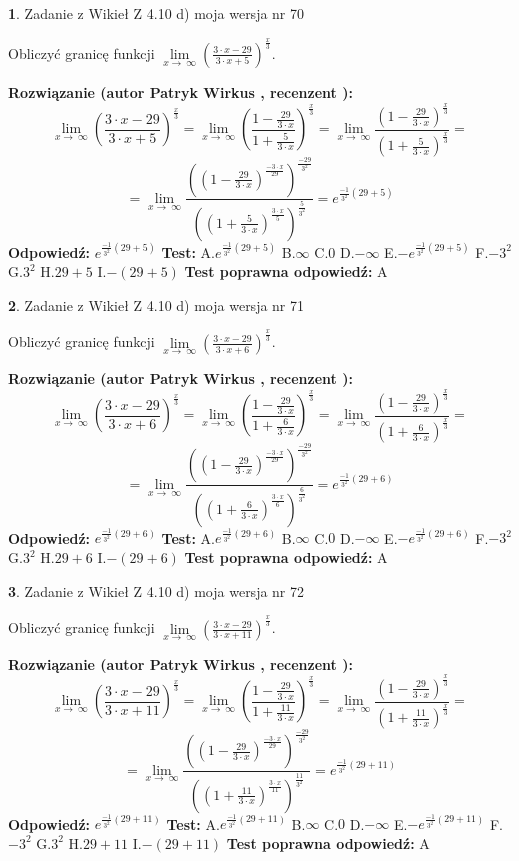 \documentclass[12pt, a4paper]{article}
\theoremstyle{definition} %
\newtheorem{zad}{}
\newcommand{\zadStart}[1]{\begin{zad}#1\newline}
\newcommand{\zadStop}{\end{zad}}
\newcommand{\rozwStart}[2]{\noindent \textbf{Rozwiązanie (autor #1 , recenzent #2): }\newline}
\newcommand{\rozwStop}{\newline}
\newcommand{\odpStart}{\noindent \textbf{Odpowiedź:}\newline}
\newcommand{\odpStop}{\newline}
\newcommand{\testStart}{\noindent \textbf{Test:}\newline}
\newcommand{\testStop}{\newline}
\newcommand{\kluczStart}{\noindent \textbf{Test poprawna odpowiedź:}\newline}
\newcommand{\kluczStop}{\newline}
\begin{document}
\zadStart{Zadanie z Wikieł Z 4.10 d) moja wersja nr 70}


Obliczyć granicę funkcji  $\lim\limits_{x\to\ \infty}(\frac{3\cdot x-29}{3\cdot x+5})^{\frac{x}{3}}$.
\zadStop
\rozwStart{Patryk Wirkus}{}
$$\lim\limits_{x\to\ \infty}(\frac{3\cdot x-29}{3\cdot x+5})^{\frac{x}{3}} = \lim\limits_{x\to\ \infty}(\frac{1-\frac{29}{3\cdot x}}{1+\frac{5}{3\cdot x}})^{\frac{x}{3}}=\lim\limits_{x\to\ \infty}\frac{(1-\frac{29}{3\cdot x})^{\frac{x}{3}}}{(1+\frac{5}{3\cdot x})^{\frac{x}{3}}}=$$
$$=\lim\limits_{x\to\ \infty}\frac{((1-\frac{29}{3\cdot x})^{\frac{-3\cdot x}{29}})^{\frac{-29}{3^{2}}}}{((1+\frac{5}{3\cdot x})^{\frac{3\cdot x}{5}})^{\frac{5}{3^{2}}}}=e^{\frac{-1}{3^{2}}(29+5)}$$
\rozwStop
\odpStart
$e^{\frac{-1}{3^{2}}(29+5)}$
\odpStop
\testStart
A.$e^{\frac{-1}{3^{2}}(29+5)}$ B.$\infty$ C.$0$ D.$-\infty$ E.$-e^{\frac{-1}{3^{2}}(29+5)}$
F.$-3^{2}$ G.$3^{2}$
H.$29+5$
I.$-(29+5)$
\testStop
\kluczStart
A
\kluczStop



\zadStart{Zadanie z Wikieł Z 4.10 d) moja wersja nr 71}


Obliczyć granicę funkcji  $\lim\limits_{x\to\ \infty}(\frac{3\cdot x-29}{3\cdot x+6})^{\frac{x}{3}}$.
\zadStop
\rozwStart{Patryk Wirkus}{}
$$\lim\limits_{x\to\ \infty}(\frac{3\cdot x-29}{3\cdot x+6})^{\frac{x}{3}} = \lim\limits_{x\to\ \infty}(\frac{1-\frac{29}{3\cdot x}}{1+\frac{6}{3\cdot x}})^{\frac{x}{3}}=\lim\limits_{x\to\ \infty}\frac{(1-\frac{29}{3\cdot x})^{\frac{x}{3}}}{(1+\frac{6}{3\cdot x})^{\frac{x}{3}}}=$$
$$=\lim\limits_{x\to\ \infty}\frac{((1-\frac{29}{3\cdot x})^{\frac{-3\cdot x}{29}})^{\frac{-29}{3^{2}}}}{((1+\frac{6}{3\cdot x})^{\frac{3\cdot x}{6}})^{\frac{6}{3^{2}}}}=e^{\frac{-1}{3^{2}}(29+6)}$$
\rozwStop
\odpStart
$e^{\frac{-1}{3^{2}}(29+6)}$
\odpStop
\testStart
A.$e^{\frac{-1}{3^{2}}(29+6)}$ B.$\infty$ C.$0$ D.$-\infty$ E.$-e^{\frac{-1}{3^{2}}(29+6)}$
F.$-3^{2}$ G.$3^{2}$
H.$29+6$
I.$-(29+6)$
\testStop
\kluczStart
A
\kluczStop



\zadStart{Zadanie z Wikieł Z 4.10 d) moja wersja nr 72}


Obliczyć granicę funkcji  $\lim\limits_{x\to\ \infty}(\frac{3\cdot x-29}{3\cdot x+11})^{\frac{x}{3}}$.
\zadStop
\rozwStart{Patryk Wirkus}{}
$$\lim\limits_{x\to\ \infty}(\frac{3\cdot x-29}{3\cdot x+11})^{\frac{x}{3}} = \lim\limits_{x\to\ \infty}(\frac{1-\frac{29}{3\cdot x}}{1+\frac{11}{3\cdot x}})^{\frac{x}{3}}=\lim\limits_{x\to\ \infty}\frac{(1-\frac{29}{3\cdot x})^{\frac{x}{3}}}{(1+\frac{11}{3\cdot x})^{\frac{x}{3}}}=$$
$$=\lim\limits_{x\to\ \infty}\frac{((1-\frac{29}{3\cdot x})^{\frac{-3\cdot x}{29}})^{\frac{-29}{3^{2}}}}{((1+\frac{11}{3\cdot x})^{\frac{3\cdot x}{11}})^{\frac{11}{3^{2}}}}=e^{\frac{-1}{3^{2}}(29+11)}$$
\rozwStop
\odpStart
$e^{\frac{-1}{3^{2}}(29+11)}$
\odpStop
\testStart
A.$e^{\frac{-1}{3^{2}}(29+11)}$ B.$\infty$ C.$0$ D.$-\infty$ E.$-e^{\frac{-1}{3^{2}}(29+11)}$
F.$-3^{2}$ G.$3^{2}$
H.$29+11$
I.$-(29+11)$
\testStop
\kluczStart
A
\kluczStop
\end{document}
